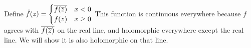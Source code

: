 \documentclass{homework}
\begin{document}
                                                                                                                                                                                                                                                                                                \begin{solution}
                                                                                                                                                                                                                                                                                                Define $\hat{f}(z) = 
                                                                                                                                                                                                                                                                                                \begin{cases}
                                                                                                                                                                                                                                                                                                    \overline{f(\overline{z})} & x < 0\\
                                                                                                                                                                                                                                                                                                        f(z)&x\geq 0
                                                                                                                                                                                                                                                                                                        \end{cases}$
                                                                                                                                                                                                                                                                                                        This function is continuous everywhere because $f$ agrees with $\overline{f(\overline{z})}$ on the real line, and holomorphic everywhere except the real line. We will show it is also holomorphic on that line.


\end{solution}
\end{document}
